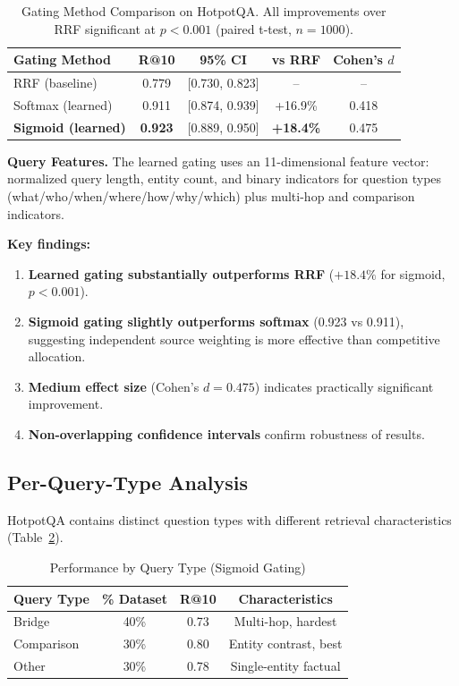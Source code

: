 \documentclass[11pt,a4paper]{article}
\begin{document}
\begin{table}[h]
\centering
\caption{Gating Method Comparison on HotpotQA. All improvements over RRF significant at $p<0.001$ (paired t-test, $n=1000$).}
\label{tab:gating_comparison}
\begin{tabular}{lcccc}
\toprule
\textbf{Gating Method} & \textbf{R@10} & \textbf{95\% CI} & \textbf{vs RRF} & \textbf{Cohen's $d$} \\
\midrule
RRF (baseline) & 0.779 & [0.730, 0.823] & -- & -- \\
Softmax (learned) & 0.911 & [0.874, 0.939] & +16.9\% & 0.418 \\
\textbf{Sigmoid (learned)} & \textbf{0.923} & [0.889, 0.950] & \textbf{+18.4\%} & 0.475 \\
\bottomrule
\end{tabular}
\end{table}

\textbf{Query Features.} The learned gating uses an 11-dimensional feature vector: normalized query length, entity count, and binary indicators for question types (what/who/when/where/how/why/which) plus multi-hop and comparison indicators.

\textbf{Key findings:}
\begin{enumerate}
    \item \textbf{Learned gating substantially outperforms RRF} ($+18.4\%$ for sigmoid, $p<0.001$).
    \item \textbf{Sigmoid gating slightly outperforms softmax} (0.923 vs 0.911), suggesting independent source weighting is more effective than competitive allocation.
    \item \textbf{Medium effect size} (Cohen's $d=0.475$) indicates practically significant improvement.
    \item \textbf{Non-overlapping confidence intervals} confirm robustness of results.
\end{enumerate}

\subsection{Per-Query-Type Analysis}

HotpotQA contains distinct question types with different retrieval characteristics (Table~\ref{tab:query_types}).

\begin{table}[h]
\centering
\caption{Performance by Query Type (Sigmoid Gating)}
\label{tab:query_types}
\begin{tabular}{lccc}
\toprule
\textbf{Query Type} & \textbf{\% Dataset} & \textbf{R@10} & \textbf{Characteristics} \\
\midrule
Bridge & 40\% & 0.73 & Multi-hop, hardest \\
Comparison & 30\% & 0.80 & Entity contrast, best \\
Other & 30\% & 0.78 & Single-entity factual \\
\bottomrule
\end{tabular}
\end{table}
\end{document}
